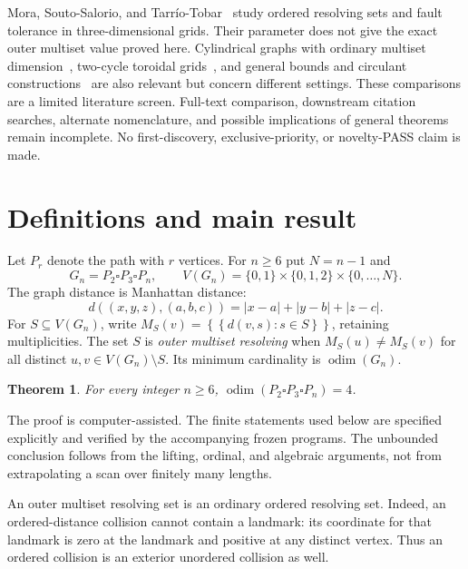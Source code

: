 \documentclass[11pt,a4paper]{article}
\newcommand{\odim}{\operatorname{odim}}
\newcommand{\ms}[1]{\left\{\!\left\{#1\right\}\!\right\}}
\newtheorem{theorem}{Theorem}
\begin{document}
Mora, Souto-Salorio, and Tarr\'io-Tobar~\cite{mora} study ordered resolving sets and fault tolerance in three-dimensional grids. Their parameter does not give the exact outer multiset value proved here. Cylindrical graphs with ordinary multiset dimension~\cite{marcelo}, two-cycle toroidal grids~\cite{peng}, and general bounds and circulant constructions~\cite{araujo} are also relevant but concern different settings. These comparisons are a limited literature screen. Full-text comparison, downstream citation searches, alternate nomenclature, and possible implications of general theorems remain incomplete. No first-discovery, exclusive-priority, or novelty-PASS claim is made.

\section{Definitions and main result}
Let $P_r$ denote the path with $r$ vertices. For $n\ge6$ put $N=n-1$ and
\[
G_n=P_2\square P_3\square P_n,\qquad
V(G_n)=\{0,1\}\times\{0,1,2\}\times\{0,\ldots,N\}.
\]
The graph distance is Manhattan distance:
\[
d((x,y,z),(a,b,c))=|x-a|+|y-b|+|z-c|.
\]
For $S\subseteq V(G_n)$, write $M_S(v)=\ms{d(v,s):s\in S}$, retaining multiplicities. The set $S$ is \emph{outer multiset resolving} when $M_S(u)\ne M_S(v)$ for all distinct $u,v\in V(G_n)\setminus S$. Its minimum cardinality is $\odim(G_n)$.

\begin{theorem}\label{thm:main}
For every integer $n\ge6$, $\odim(P_2\square P_3\square P_n)=4$.
\end{theorem}

The proof is computer-assisted. The finite statements used below are specified explicitly and verified by the accompanying frozen programs. The unbounded conclusion follows from the lifting, ordinal, and algebraic arguments, not from extrapolating a scan over finitely many lengths.

An outer multiset resolving set is an ordinary ordered resolving set. Indeed, an ordered-distance collision cannot contain a landmark: its coordinate for that landmark is zero at the landmark and positive at any distinct vertex. Thus an ordered collision is an exterior unordered collision as well.
\end{document}

